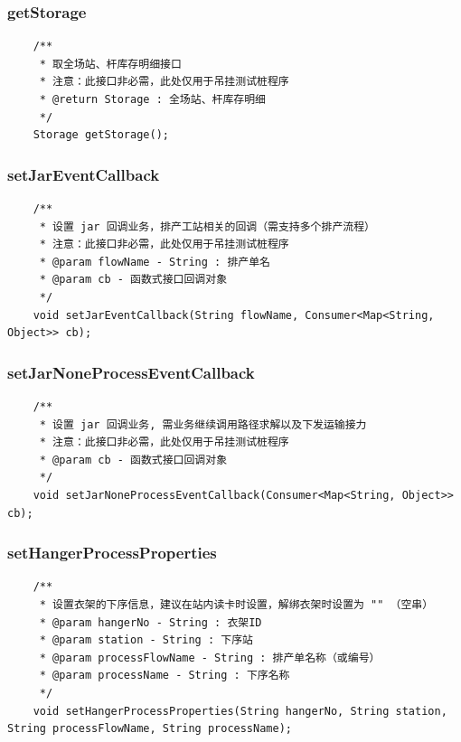 \subsubsection{getStorage}
\begin{lstlisting}
    /**
     * 取全场站、杆库存明细接口
     * 注意：此接口非必需，此处仅用于吊挂测试桩程序
     * @return Storage : 全场站、杆库存明细
     */
    Storage getStorage();
\end{lstlisting}\vspace{-30pt}

\subsubsection{setJarEventCallback}
\begin{lstlisting}
    /**
     * 设置 jar 回调业务，排产工站相关的回调（需支持多个排产流程）
     * 注意：此接口非必需，此处仅用于吊挂测试桩程序
     * @param flowName - String : 排产单名
     * @param cb - 函数式接口回调对象
     */
    void setJarEventCallback(String flowName, Consumer<Map<String, Object>> cb);
\end{lstlisting}\vspace{-30pt}

\subsubsection{setJarNoneProcessEventCallback}
\begin{lstlisting}
    /**
     * 设置 jar 回调业务, 需业务继续调用路径求解以及下发运输接力
     * 注意：此接口非必需，此处仅用于吊挂测试桩程序
     * @param cb - 函数式接口回调对象
     */
    void setJarNoneProcessEventCallback(Consumer<Map<String, Object>> cb);
\end{lstlisting}\vspace{-30pt}

\subsubsection{setHangerProcessProperties}
\begin{lstlisting}
    /**
     * 设置衣架的下序信息，建议在站内读卡时设置，解绑衣架时设置为 "" （空串）
     * @param hangerNo - String : 衣架ID
     * @param station - String : 下序站
     * @param processFlowName - String : 排产单名称（或编号）
     * @param processName - String : 下序名称
     */
    void setHangerProcessProperties(String hangerNo, String station, String processFlowName, String processName);
\end{lstlisting}\vspace{-30pt}
\\

